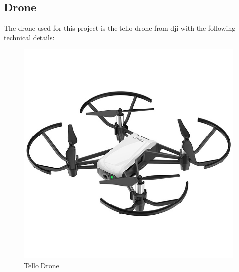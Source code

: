 \documentclass[a4paper,11pt,singlespacing]{article}
\begin{document}
\subsection{Drone}

The drone used for this project is the tello drone from dji with the following technical details:

\begin{figure}[h!]
	\centering
	\includegraphics[scale=0.5]{images/tello_front.jpeg}
	\caption{Tello Drone}
	\label{tello_drone}
\end{figure}
\end{document}
